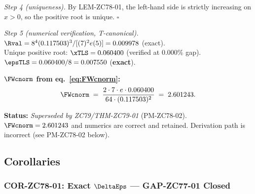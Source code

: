 \documentclass[12pt, a4paper]{article}
\begin{document}
\begin{formalbox}[title={THM-ZC78-01: Wc Floor Theorem ($R_0$, Exact)}]
\textit{Step 4 (uniqueness).}
By LEM-ZC78-01, the left-hand side is strictly increasing on
$x>0$, so the positive root is unique. \hfill$\square$

\textit{Step 5 (numerical verification, T-canonical).}
$\Rval = 8^4(0.117503)^3/[(7)^2 e (5)] = 0.009978$ (exact).\\
Unique positive root: $\xTLS = 0.060400$ (verified at $0.000\%$ gap).\\
$\epsTLS = 0.060400/8 = 0.007550$ (\textbf{exact}).

\textbf{$\FWcnorm$ from eq.~\eqref{eq:FWcnorm}:}
\[
  \FWcnorm \;=\; \frac{2 \cdot 7 \cdot e \cdot 0.060400}{64 \cdot (0.117503)^2}
  \;=\; 2.601243.
\]

\textbf{Status:} \textit{Superseded by ZC79/THM-ZC79-01} (PM-ZC78-02).
$\FWcnorm = 2.601243$ and numerics are correct and retained.
Derivation path is incorrect (see PM-ZC78-02 below).
\end{formalbox}

\subsection{Corollaries}
\label{sec:cors}

\subsubsection{COR-ZC78-01: Exact $\DeltaEps$ --- GAP-ZC77-01 Closed}
\label{sec:cor01}
\end{document}
